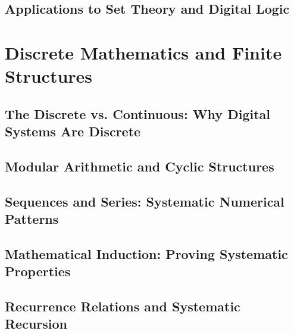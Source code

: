 \documentclass[12pt, oneside, openany]{book}
\begin{document}
\section{Applications to Set Theory and Digital Logic}


\chapter{Discrete Mathematics and Finite Structures}

\section{The Discrete vs. Continuous: Why Digital Systems Are Discrete}

\section{Modular Arithmetic and Cyclic Structures}

\section{Sequences and Series: Systematic Numerical Patterns}

\section{Mathematical Induction: Proving Systematic Properties}

\section{Recurrence Relations and Systematic Recursion}
\end{document}
